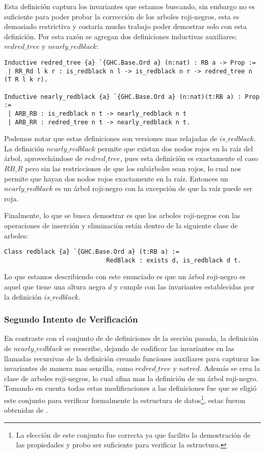 \documentclass[letterpaper,12pt,oneside]{book}
\newcommand{\arn}{árbol roji-negro}
\newcommand{\arns}{arboles roji-negros}
\theoremstyle{plain}
\theoremstyle{definition}
\theoremstyle{remark}
\begin{document}
Esta definici\'on captura los invariantes que estamos buscando, sin embargo no es suficiente para poder 
probar la correcci\'on de los {\arns}, esta es demasiado restrictiva y costaría mucho trabajo poder 
demostrar solo con esta definici\'on. Por esta razón se agregan dos definiciones inductivas auxiliares; 
$redred\_tree$ y $nearly\_redblack$: 

\begin{verbatim}
Inductive redred_tree {a} `{GHC.Base.Ord a} (n:nat) : RB a -> Prop :=
 | RR_Rd l k r : is_redblack n l -> is_redblack n r -> redred_tree n (T R l k r).

Inductive nearly_redblack {a} `{GHC.Base.Ord a} (n:nat)(t:RB a) : Prop :=
 | ARB_RB : is_redblack n t -> nearly_redblack n t
 | ARB_RR : redred_tree n t -> nearly_redblack n t.
\end{verbatim}

Podemos notar que estas definiciones son versiones mas relajadas de $is\_redblack$. La definici\'on 
$nearly\_redblack$ permite que existan dos nodos rojos en la ra\'iz del \'arbol, aprovech\'andose de
$redred\_tree$, pues esta definici\'on es exactamente el caso $RB\_R$ pero sin las restricciones de que 
los sub\'arboles sean rojos, lo cual nos permite que hayan dos nodos rojos exactamente en la ra\'iz. 
Entonces un $nearly\_redblack$ es un {\arn} con la excepci\'on de que la ra\'iz puede ser roja. 

Finalmente, lo que se busca demostrar es que los {\arns} con las operaciones de inserci\'on y 
eliminaci\'on están dentro de la siguiente clase de arboles:

\begin{verbatim}
Class redblack {a} `{GHC.Base.Ord a} (t:RB a) := 
                            RedBlack : exists d, is_redblack d t.
\end{verbatim}

Lo que estamos describiendo con este enunciado es que un {\arn} es aquel que tiene una altura negra $d$ y
cumple con las invariantes establecidas por la definici\'on $is\_redblack$.

\subsubsection{Segundo Intento de Verificaci\'on}
En contraste con el conjunto de de definiciones de la secci\'on pasada, la definici\'on de 
$nearly\_redblack$ se reescribe, dejando de codificar las invariantes en las llamadas recursivas de la 
definición creando funciones auxiliares para capturar los invariantes de manera mas sencilla, como 
$redred\_tree$ y $notred$. Además se crea la clase de {\arns}, lo cual afina mas la definici\'on de un 
{\arn}. Tomando en cuenta todas estas modificaciones a las definiciones fue que se eligió este conjunto 
para verificar formalmente la estructura de datos\footnote{La elecci\'on de este conjunto fue correcta ya
que facilito la demostraci\'on de las propiedades y probo ser suficiente para verificar la estructura.}, 
estas fueron obtenidas de \cite{MSetRBT}.
\end{document}
